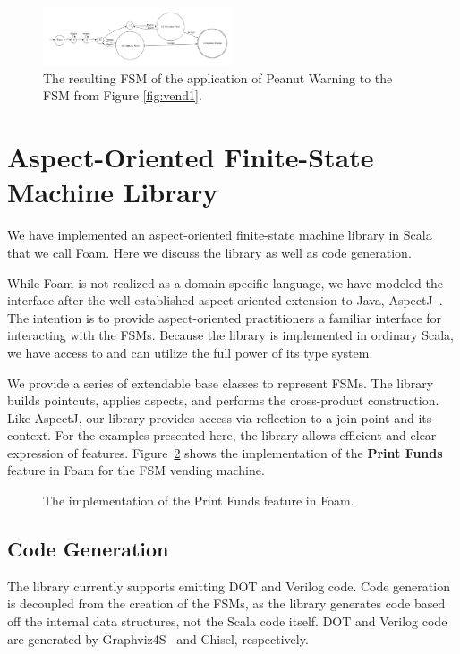 \documentclass[conference]{IEEEtran}
\begin{document}
\begin{figure}
    \centering
    \includegraphics[width=0.5\textwidth]{figures/vend3.pdf}
    \caption{The resulting FSM of the application of Peanut Warning to the FSM from Figure \ref{fig:vend1}.}
    \label{fig:applyadvice2}
\end{figure}


\section{Aspect-Oriented Finite-State Machine Library}\label{sec:foam}
We have implemented an aspect-oriented finite-state machine library in Scala that we call Foam. Here we discuss the library as well as code generation.

While Foam is not realized as a domain-specific language, we have modeled the interface after the well-established aspect-oriented extension to Java, AspectJ~\cite{aspectj}. The intention is to provide aspect-oriented practitioners a familiar interface for interacting with the FSMs. Because the library is implemented in ordinary Scala, we have access to and can utilize the full power of its type system. 

We provide a series of extendable base classes to represent FSMs. The library builds pointcuts, applies aspects, and performs the cross-product construction. Like AspectJ, our library provides access via reflection to a join point and its context.  For the examples presented here, the library allows efficient and clear expression of features.  Figure~\ref{lst:PrintFunds} shows the implementation of the \textbf{Print Funds} feature in Foam for the FSM vending machine.

\begin{figure}
    \centering
    
    \caption{The implementation of the Print Funds feature in Foam.}
    \label{lst:PrintFunds}
\end{figure}

\subsection{Code Generation}
The library currently supports emitting DOT and Verilog code. Code generation is decoupled from the creation of the FSMs, as the library generates code based off the internal data structures, not the Scala code itself. DOT and Verilog code are generated by Graphviz4S~\cite{Ldpe2G:19} and Chisel, respectively. 
\end{document}
